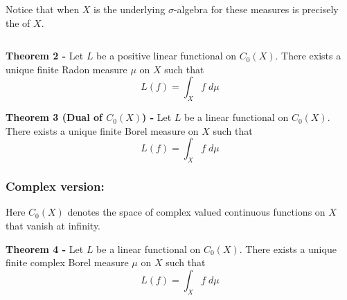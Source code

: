 \documentclass[12pt]{article}
\begin{document}
Notice that when $X$ is  the underlying $\sigma$-algebra for these measures is precisely the  of $X$.

$\,$

{\bf Theorem 2 -} Let $L$ be a positive linear functional on $C_0(X)$. There exists a unique finite Radon measure $\mu$ on $X$ such that
\begin{displaymath}
L(f) = \int_X f \; d\mu
\end{displaymath}


{\bf Theorem 3 (Dual of $C_0(X)$) -} Let $L$ be a  linear functional on $C_0(X)$. There exists a unique finite  Borel measure on $X$ such that
\begin{displaymath}
L(f) = \int_X f \; d\mu
\end{displaymath}

\subsubsection{Complex version:}

Here $C_0(X)$ denotes the space of complex valued continuous functions on $X$ that vanish at infinity.

{\bf Theorem 4 -} Let $L$ be a  linear functional on $C_0(X)$. There exists a unique finite complex  Borel measure $\mu$ on $X$ such that
\begin{displaymath}
L(f) = \int_X f \; d\mu
\end{displaymath}
\end{document}
